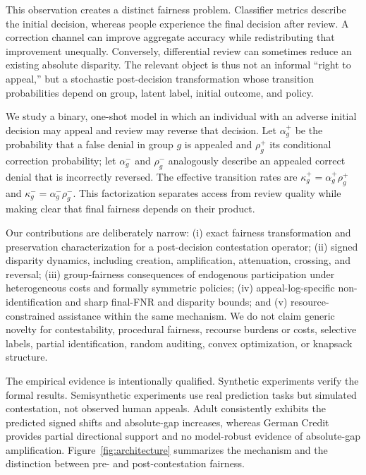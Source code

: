 \documentclass[manuscript,screen,review]{jair}
\begin{document}
This observation creates a distinct fairness problem.  Classifier metrics
describe the initial decision, whereas people experience the final decision
after review.  A correction channel can improve aggregate accuracy while
redistributing that improvement unequally.  Conversely, differential review
can sometimes reduce an existing absolute disparity.  The relevant object is thus not an
informal ``right to appeal,'' but a stochastic post-decision transformation
whose transition probabilities depend on group, latent label, initial outcome,
and policy.

We study a binary, one-shot model in which an individual with an adverse
initial decision may appeal and review may reverse that decision.  Let
$\alpha_g^+$ be the probability that a false denial in group $g$ is appealed
and $\rho_g^+$ its conditional correction probability; let $\alpha_g^-$ and
$\rho_g^-$ analogously describe an appealed correct denial that is incorrectly
reversed.  The effective transition rates are
$\kappa_g^+=\alpha_g^+\rho_g^+$ and
$\kappa_g^-=\alpha_g^-\rho_g^-$.  This factorization separates access from
review quality while making clear that final fairness depends on their product.

Our contributions are deliberately narrow: (i) exact fairness transformation
and preservation characterization for a post-decision contestation operator;
(ii) signed disparity dynamics, including creation, amplification,
attenuation, crossing, and reversal; (iii) group-fairness consequences of
endogenous participation under heterogeneous costs and formally symmetric
policies; (iv) appeal-log-specific non-identification and sharp final-FNR and
disparity bounds; and (v) resource-constrained assistance within the same
mechanism.  We do not claim generic novelty for contestability, procedural
fairness, recourse burdens or costs, selective labels, partial identification,
random auditing, convex optimization, or knapsack structure.

The empirical evidence is intentionally qualified.  Synthetic experiments
verify the formal results.  Semisynthetic experiments use real prediction
tasks but simulated contestation, not observed human appeals.  Adult
consistently exhibits the predicted signed shifts and absolute-gap increases,
whereas German Credit provides partial directional support and no model-robust
evidence of absolute-gap amplification.
Figure~\ref{fig:architecture} summarizes the mechanism and the distinction
between pre- and post-contestation fairness.
\end{document}
